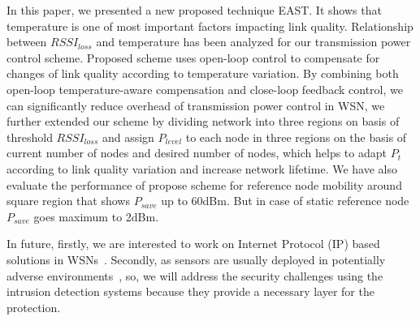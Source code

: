 \documentclass[12pt, conference, compsocconf, onecolumn, draftcls]{IEEEtran}
\begin{document}
In this paper, we presented a new proposed technique  EAST. It shows that temperature is one of most important factors impacting link quality. Relationship between $RSSI_{loss}$ and temperature has been analyzed for our transmission power control scheme. Proposed scheme uses open-loop control to compensate for changes of link quality according to temperature variation. By combining both open-loop temperature-aware compensation and close-loop feedback control, we can significantly reduce overhead of transmission power control in WSN, we  further extended our scheme by dividing network into three regions on basis of threshold $RSSI_{loss}$ and assign $P_{level}$ to each node in three regions on the basis of current number of nodes and desired number of nodes, which helps to adapt $P_{t}$ according to link quality variation and increase network lifetime. We have also evaluate the performance of propose scheme for reference node mobility around square region that shows $P_{save}$ up to 60dBm. But in case of static reference node $P_{save}$ goes maximum to 2dBm.

In future, firstly, we are interested to work on Internet Protocol (IP) based solutions in WSNs~\cite{14}. Secondly, as sensors are usually deployed in potentially adverse environments~\cite{15}, so, we will address the security challenges using the intrusion detection systems because they provide a necessary layer for the protection.
\end{document}

